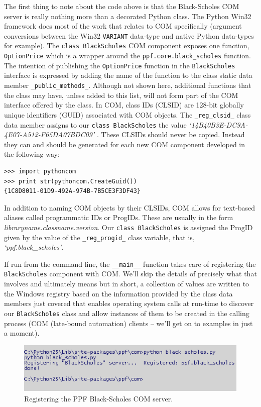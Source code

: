 The first thing to note about the code above is that the Black-Scholes
COM server is really nothing more than a decorated Python class. The
Python Win32 framework does most of the work that relates to COM
specifically (argument conversions between the Win32 \verb|VARIANT|
data-type and native Python data-types for example). The \verb|class BlackScholes|
COM component exposes one function, \verb|OptionPrice|
which is a wrapper around the \verb|ppf.core.black_scholes|
function. The intention of publishing the \verb|OptionPrice| function
in the \verb|BlackScholes| interface is expressed by adding the name
of the function to the class static data member
\verb|_public_methods_|. Although not shown here, additional
functions that the class may have, unless added to this list, will not
form part of the COM interface offered by the class. In COM, class IDs
(CLSID) are 128-bit globally unique identifiers (GUID) associated with
COM objects. The \verb|_reg_clsid_| class data member assigns to our
\verb|class BlackScholes| the value \emph{`{14B40B3E-DC9A-4E07-A512-F65DA07BDC09}'}
. These CLSIDs should never be copied. Instead they can and should be
generated for each new COM component developed in the following way:
\begin{verbatim} 
>>> import pythoncom
>>> print str(pythoncom.CreateGuid())
{1C8D8011-01D9-492A-974B-7B5CE3F3DF43}
\end{verbatim}
In addition to naming COM objects by their CLSIDs, COM allows for
text-based aliases called programmatic IDs or ProgIDs. These are
usually in the form \emph{libraryname.classname.version}. Our
\verb|class BlackScholes| is assigned the ProgID given by the value of
the \verb|_reg_progid_| class variable, that is,\\
\emph{`ppf.black\_scholes'}.

If run from the command line, the \verb|__main__| function takes care
of registering the \verb|BlackScholes| component with COM. We'll skip
the details of precisely what that involves and ultimately means but
in short, a collection of values are written to the Windows registry
based on the information provided by the class data members just
covered that enables operating system calls at run-time to discover
our \verb|BlackScholes| class and allow instances of them to be
created in the calling process (COM (late-bound automation) clients --
we'll get on to examples in just a moment).
\begin{figure}
\centering
\includegraphics[scale=0.5]{img/register_server.PNG}
\caption{Registering the PPF Black-Scholes COM server.}
\end{figure}

